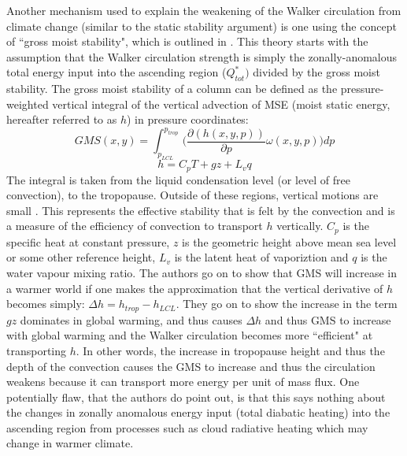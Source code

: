 \documentclass[letterpaper,12pt,titlepage,oneside,final]{book}
\begin{document}
Another mechanism used to explain the weakening of the Walker circulation from climate change (similar to the static stability argument) is one using the concept of ``gross moist stability", which is outlined in \citep{wills_local_2017}. This theory starts with the assumption that the Walker circulation strength is simply the zonally-anomalous total energy input into the ascending region ($Q_{tot}^{*})$ divided by the gross moist stability. The gross moist stability of a column can be defined as the pressure-weighted vertical integral of the vertical advection of MSE (moist static energy, hereafter referred to as $h$) in pressure coordinates:
\begin{equation}\label{eq:GMS}
GMS(x,y) = \int_{p_{LCL}}^{p_{trop}}\bigg(\frac{\partial({h(x,y,p)})}{\partial{p}}\omega(x,y,p)\bigg){dp}
\end{equation}
\begin{equation}\label{eq:MSE}
h=C_{p}T + gz + L_{v}q
\end{equation}
The integral is taken from the liquid condensation level (or level of free convection), to the tropopause. Outside of these regions, vertical motions are small \citep{wills_local_2017}. This represents the effective stability that is felt by the convection and is a measure of the efficiency of convection to transport $h$ vertically. $C_{p}$ is the specific heat at constant pressure, $z$ is the geometric height above mean sea level or some other reference height, $L_{v}$ is the latent heat of vaporiztion and $q$ is the water vapour mixing ratio. The authors go on to show that GMS will increase in a warmer world if one makes the approximation that the vertical derivative of $h$ becomes simply: $\Delta{h} = h_{trop} - h_{LCL}$. They go on to show the increase in the term $gz$ dominates in global warming, and thus causes $\Delta{h}$ and thus GMS to increase with global warming and the Walker circulation becomes more ``efficient" at transporting $h$. In other words, the increase in tropopause height and thus the depth of the convection causes the GMS to increase and thus the circulation weakens because it can transport more energy per unit of mass flux. One potentially flaw, that the authors do point out, is that this says nothing about the changes in zonally anomalous energy input (total diabatic heating) into the ascending region from processes such as cloud radiative heating which may change in warmer climate.
\end{document}
